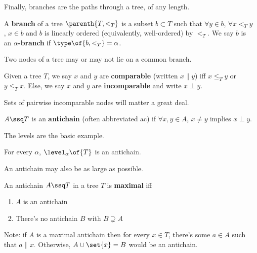 Finally, branches are the paths through a tree, of any length.

\begin{boxdefinition}[Branch]
    A \textbf{branch} of a tree $\parenth{T, <_T}$ is a subset $b \subset T$ such that $\forall y \in b$, $\forall x <_T y$, $x \in b$ and $b$ is linearly ordered (equivalently, well-ordered) by $<_T$. We say $b$ is an \textbf{$\alpha$-branch} if $\type\of{b, <_T} = \alpha$.
\end{boxdefinition}

Two nodes of a tree may or may not lie on a common branch.

\begin{boxdefinition}
    Given a tree $T$, we say $x$ and $y$ are \textbf{comparable} (written $x \parallel y$) iff $x \leq_T y$ or $y \leq_T x$. Else, we say $x$ and $y$ are \textbf{incomparable} and write $x \perp y$.
\end{boxdefinition}

Sets of pairwise incomparable nodes will matter a great deal.

\begin{boxdefinition}[Antichain]
    $A \ssq T$ is an \textbf{antichain} (often abbreviated ac) if $\forall x, y \in A$, $x \neq y$ implies $x \perp y$.
\end{boxdefinition}

The levels are the basic example.

\begin{boxexample}
    For every $\alpha$, $\level_{\alpha}\of{T}$ is an antichain.
\end{boxexample}

An antichain may also be as large as possible.

\begin{boxdefinition}
    An antichain $A \ssq T$ in a tree $T$ is \textbf{maximal} iff
    \begin{enumerate}
        \item $A$ is an antichain
        \item There's no antichain $B$ with $B \supsetneq A$
    \end{enumerate}
\end{boxdefinition}

Note: if $A$ is a maximal antichain then for every $x \in T$, there's some $a \in A$ such that $a \parallel x$. Otherwise, $A \cup \set{x} = B$ would be an antichain.
